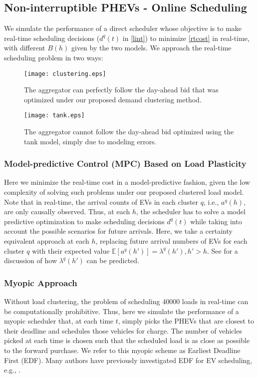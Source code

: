 \documentclass[10pt]{IEEEtran}
\begin{document}
\subsection{Non-interruptible PHEVs - Online Scheduling}
We simulate the performance of a direct scheduler whose objective is to make real-time scheduling decisions ($d^q(t)$ in \eqref{lint}) to minimize \eqref{rtcost} in real-time, with different $B(h)$ given by the two models.  We approach the real-time scheduling problem in two ways:

\begin{figure}
\centering
\texttt{[image: clustering.eps]} 
\caption{The aggregator can perfectly follow the day-ahead bid that was optimized under our proposed demand clustering method.}
\label{fig:clustering}
\end{figure}

\begin{figure}
\texttt{[image: tank.eps]} 
\caption{The aggregator cannot follow the day-ahead bid optimized using the tank model, simply due to modeling errors.}
\label{fig:tank}
\end{figure}

\subsubsection{Model-predictive Control (MPC) Based on Load Plasticity} Here we minimize the real-time cost in a model-predictive fashion, given the low complexity of solving such problems under our proposed clustered load model. 
Note that in real-time, the arrival counts of EVs in each cluster $q$, i.e., $a^q(h)$, are only causally observed. Thus, at each $h$, the scheduler has to solve a model predictive optimization to make scheduling decisions $d^q(t)$ while taking into account the possible scenarios for future arrivals. Here, we take a certainty equivalent approach at each $h$, replacing future arrival numbers of EVs for each cluster $q$  with their expected value $\mathbb{E}[a^q(h')] = \lambda^q(h'), h'>h$. See \cite{alizadeh2013ev} for a discussion of how $\lambda^q(h')$ can be predicted.

\subsubsection{Myopic Approach}Without load clustering, the problem of scheduling 40000 loads in real-time can be computationally prohibitive. Thus, here we simulate the performance of a myopic scheduler that, at each time $t$, simply picks the PHEVs that are closest to their deadline and schedules those vehicles for charge. The number of vehicles picked at each time is chosen such that the scheduled load is as close as possible to the forward purchase. We refer to this myopic scheme as Earliest Deadline First (EDF). Many authors have previously investigated EDF for EV scheduling, e.g., \cite{chen2012large,subramanian2012real}.
\end{document}

